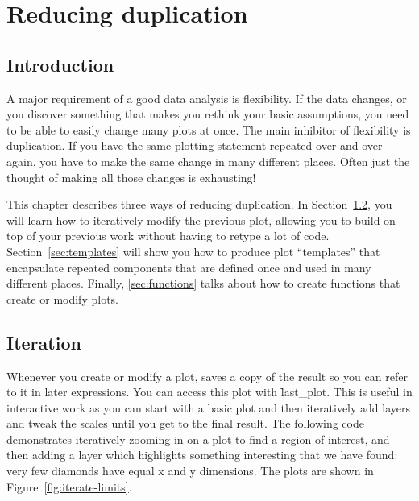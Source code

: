 

% 


\chapter{Reducing duplication}
\label{cha:duplication}

\section{Introduction}

A major requirement of a good data analysis is flexibility. If the data changes, or you discover something that makes you rethink your basic assumptions, you need to be able to easily change many plots at once. The main inhibitor of flexibility is duplication. If you have the same plotting statement repeated over and over again, you have to make the same change in many different places. Often just the thought of making all those changes is exhausting!

This chapter describes three ways of reducing duplication. In Section~\ref{sec:iteration}, you will learn how to iteratively modify the previous plot, allowing you to build on top of your previous work without having to retype a lot of code. Section~\ref{sec:templates} will show you how to produce plot ``templates'' that encapsulate repeated components that are defined once and used in many different places. Finally, \ref{sec:functions} talks about how to create functions that create or modify plots. 

\section{Iteration}
\label{sec:iteration}

Whenever you create or modify a plot, \ggplot saves a copy of the result so you can refer to it in later expressions. You can access this plot with \f{last_plot}. This is useful in interactive work as you can start with a basic plot and then iteratively add layers and tweak the scales until you get to the final result. The following code demonstrates iteratively zooming in on a plot to find a region of interest, and then adding a layer which highlights something interesting that we have found: very few diamonds have equal x and y dimensions. The plots are shown in Figure~\ref{fig:iterate-limits}.

